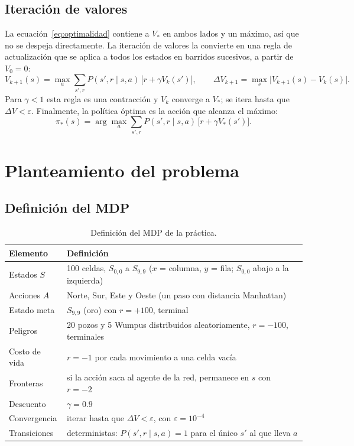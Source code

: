 \documentclass[11pt,letterpaper]{article}
\begin{document}
\subsection{Iteración de valores}
La ecuación~\eqref{eq:optimalidad} contiene a $V_*$ en ambos lados y un máximo, así que no se despeja directamente. La iteración de valores la convierte en una regla de actualización que se aplica a todos los estados en barridos sucesivos, a partir de $V_0 = 0$:
\begin{equation}
\label{eq:vi}
V_{k+1}(s) = \max_a \sum_{s',r} P(s',r \mid s,a)\,\big[r + \gamma V_k(s')\big], \qquad \Delta V_{k+1} = \max_s \big|V_{k+1}(s) - V_k(s)\big|.
\end{equation}
Para $\gamma < 1$ esta regla es una contracción y $V_k$ converge a $V_*$; se itera hasta que $\Delta V < \varepsilon$. Finalmente, la política óptima es la acción que alcanza el máximo:
\begin{equation}
\pi_*(s) = \arg\max_a \sum_{s',r} P(s',r \mid s,a)\,\big[r + \gamma V_*(s')\big].
\end{equation}

\section{Planteamiento del problema}

\subsection{Definición del MDP}
\begin{table}[H]
\centering
\small
\caption{Definición del MDP de la práctica.}
\label{tab:mdp}
\begin{tabular}{ll}
\toprule
Elemento & Definición \\
\midrule
Estados $S$ & 100 celdas, $S_{0,0}$ a $S_{9,9}$ ($x$ = columna, $y$ = fila; $S_{0,0}$ abajo a la izquierda) \\
Acciones $A$ & Norte, Sur, Este y Oeste (un paso con distancia Manhattan) \\
Estado meta & $S_{9,9}$ (oro) con $r = +100$, terminal \\
Peligros & 20 pozos y 5 Wumpus distribuidos aleatoriamente, $r = -100$, terminales \\
Costo de vida & $r = -1$ por cada movimiento a una celda vacía \\
Fronteras & si la acción saca al agente de la red, permanece en $s$ con $r = -2$ \\
Descuento & $\gamma = 0.9$ \\
Convergencia & iterar hasta que $\Delta V < \varepsilon$, con $\varepsilon = 10^{-4}$ \\
Transiciones & deterministas: $P(s', r \mid s, a) = 1$ para el único $s'$ al que lleva $a$ \\
\bottomrule
\end{tabular}
\end{table}
\end{document}
